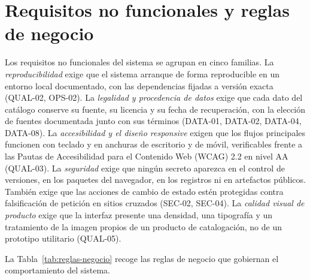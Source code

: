 \section{Requisitos no funcionales y reglas de negocio}\label{sec:req-no-funcionales}\label{sec:req-reglas}

Los requisitos no funcionales del sistema se agrupan en cinco familias. La
\textit{reproducibilidad} exige que el sistema arranque de forma reproducible en un entorno
local documentado, con las dependencias fijadas a versión exacta (QUAL-02, OPS-02). La
\textit{legalidad y procedencia de datos} exige que cada dato del catálogo conserve su
fuente, su licencia y su fecha de recuperación, con la elección de fuentes documentada junto
con sus términos (DATA-01, DATA-02, DATA-04, DATA-08). La \textit{accesibilidad y el diseño
responsive} exigen que los flujos principales funcionen con teclado y en anchuras de
escritorio y de móvil, verificables frente a las Pautas de Accesibilidad para el Contenido
Web (WCAG) 2.2 en nivel AA~\cite{wcag22} (QUAL-03). La \textit{seguridad} exige que ningún secreto aparezca en el control de versiones, en los paquetes del
navegador, en los registros ni en artefactos públicos. También exige que las acciones de
cambio de estado estén protegidas contra falsificación de petición en sitios cruzados
(SEC-02, SEC-04). La
\textit{calidad visual de producto} exige que la interfaz presente una densidad, una
tipografía y un tratamiento de la imagen propios de un producto de catalogación, no de un
prototipo utilitario (QUAL-05).

La Tabla~\ref{tab:reglas-negocio} recoge las reglas de negocio que gobiernan el
comportamiento del sistema.

